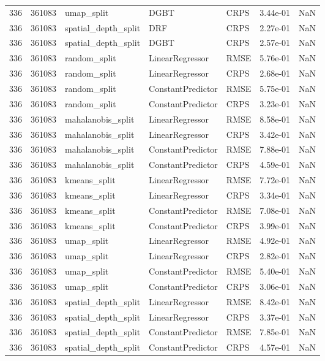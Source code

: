 \begin{tabular}{rrlllrr}
336 & 361083 & umap\_split & DGBT & CRPS & 3.44e-01 & NaN \\
336 & 361083 & spatial\_depth\_split & DRF & CRPS & 2.27e-01 & NaN \\
336 & 361083 & spatial\_depth\_split & DGBT & CRPS & 2.57e-01 & NaN \\
336 & 361083 & random\_split & LinearRegressor & RMSE & 5.76e-01 & NaN \\
336 & 361083 & random\_split & LinearRegressor & CRPS & 2.68e-01 & NaN \\
336 & 361083 & random\_split & ConstantPredictor & RMSE & 5.75e-01 & NaN \\
336 & 361083 & random\_split & ConstantPredictor & CRPS & 3.23e-01 & NaN \\
336 & 361083 & mahalanobis\_split & LinearRegressor & RMSE & 8.58e-01 & NaN \\
336 & 361083 & mahalanobis\_split & LinearRegressor & CRPS & 3.42e-01 & NaN \\
336 & 361083 & mahalanobis\_split & ConstantPredictor & RMSE & 7.88e-01 & NaN \\
336 & 361083 & mahalanobis\_split & ConstantPredictor & CRPS & 4.59e-01 & NaN \\
336 & 361083 & kmeans\_split & LinearRegressor & RMSE & 7.72e-01 & NaN \\
336 & 361083 & kmeans\_split & LinearRegressor & CRPS & 3.34e-01 & NaN \\
336 & 361083 & kmeans\_split & ConstantPredictor & RMSE & 7.08e-01 & NaN \\
336 & 361083 & kmeans\_split & ConstantPredictor & CRPS & 3.99e-01 & NaN \\
336 & 361083 & umap\_split & LinearRegressor & RMSE & 4.92e-01 & NaN \\
336 & 361083 & umap\_split & LinearRegressor & CRPS & 2.82e-01 & NaN \\
336 & 361083 & umap\_split & ConstantPredictor & RMSE & 5.40e-01 & NaN \\
336 & 361083 & umap\_split & ConstantPredictor & CRPS & 3.06e-01 & NaN \\
336 & 361083 & spatial\_depth\_split & LinearRegressor & RMSE & 8.42e-01 & NaN \\
336 & 361083 & spatial\_depth\_split & LinearRegressor & CRPS & 3.37e-01 & NaN \\
336 & 361083 & spatial\_depth\_split & ConstantPredictor & RMSE & 7.85e-01 & NaN \\
336 & 361083 & spatial\_depth\_split & ConstantPredictor & CRPS & 4.57e-01 & NaN \\

\end{tabular}
